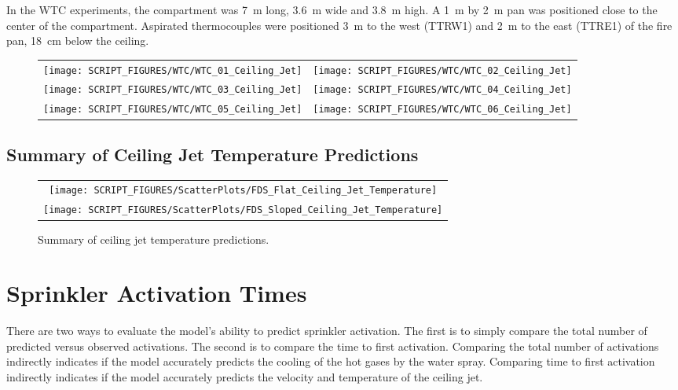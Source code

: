 In the WTC experiments, the compartment was 7~m long, 3.6~m wide and 3.8~m high. A 1~m by 2~m pan was positioned close to the center of the compartment. Aspirated thermocouples were positioned 3~m to the west (TTRW1) and 2~m to the east (TTRE1) of the fire pan, 18~cm below the ceiling.


\begin{figure}[h!]
\begin{tabular*}{\textwidth}{l@{\extracolsep{\fill}}r}
\texttt{[image: SCRIPT\_FIGURES/WTC/WTC\_01\_Ceiling\_Jet]} &
\texttt{[image: SCRIPT\_FIGURES/WTC/WTC\_02\_Ceiling\_Jet]} \\
\texttt{[image: SCRIPT\_FIGURES/WTC/WTC\_03\_Ceiling\_Jet]} &
\texttt{[image: SCRIPT\_FIGURES/WTC/WTC\_04\_Ceiling\_Jet]} \\
\texttt{[image: SCRIPT\_FIGURES/WTC/WTC\_05\_Ceiling\_Jet]} &
\texttt{[image: SCRIPT\_FIGURES/WTC/WTC\_06\_Ceiling\_Jet]}
\end{tabular*}
\label{WTC_Jet}
\end{figure}

\clearpage

\subsection{Summary of Ceiling Jet Temperature Predictions}

\begin{figure}[h!]
\begin{center}
\begin{tabular}{c}
\texttt{[image: SCRIPT\_FIGURES/ScatterPlots/FDS\_Flat\_Ceiling\_Jet\_Temperature]} \\
\texttt{[image: SCRIPT\_FIGURES/ScatterPlots/FDS\_Sloped\_Ceiling\_Jet\_Temperature]}
\end{tabular}
\end{center}
\caption[Summary of ceiling jet temperature predictions.]
{Summary of ceiling jet temperature predictions.}
\end{figure}



\clearpage

\section{Sprinkler Activation Times}

There are two ways to evaluate the model's ability to predict sprinkler activation. The first is to simply compare the total number of predicted versus observed activations. The second is to compare the time to first activation. Comparing the total number of activations indirectly indicates if the model accurately predicts the cooling of the hot gases by the water spray. Comparing time to first activation indirectly indicates if the model accurately predicts the velocity and temperature of the ceiling jet.

